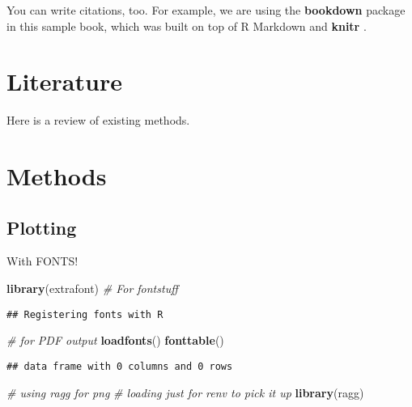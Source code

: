 \documentclass[ngerman,a4paper,]{scrartcl}
\newenvironment{Shaded}{\begin{snugshade}}{\end{snugshade}}
\newcommand{\CommentTok}[1]{\textcolor[rgb]{0.56,0.35,0.01}{\textit{#1}}}
\newcommand{\KeywordTok}[1]{\textcolor[rgb]{0.13,0.29,0.53}{\textbf{#1}}}
\newcommand{\NormalTok}[1]{#1}
\begin{document}
You can write citations, too. For example, we are using the \textbf{bookdown} package \citep{R-bookdown} in this sample book, which was built on top of R Markdown and \textbf{knitr} \citep{xie2015}.

\hypertarget{literature}{%
\section{Literature}\label{literature}}

Here is a review of existing methods.

\hypertarget{methods}{%
\section{Methods}\label{methods}}

\hypertarget{plotting}{%
\subsection{Plotting}\label{plotting}}

With FONTS!

\begin{Shaded}
\begin{Highlighting}[]
\KeywordTok{library}\NormalTok{(extrafont) }\CommentTok{# For fontstuff}
\end{Highlighting}
\end{Shaded}

\begin{verbatim}
## Registering fonts with R
\end{verbatim}

\begin{Shaded}
\begin{Highlighting}[]
\CommentTok{# for PDF output}
\KeywordTok{loadfonts}\NormalTok{()}
\KeywordTok{fonttable}\NormalTok{()}
\end{Highlighting}
\end{Shaded}

\begin{verbatim}
## data frame with 0 columns and 0 rows
\end{verbatim}

\begin{Shaded}
\begin{Highlighting}[]
\CommentTok{# using ragg for png}
\CommentTok{# loading just for renv to pick it up}
\KeywordTok{library}\NormalTok{(ragg)}
\end{Highlighting}
\end{Shaded}
\end{document}
